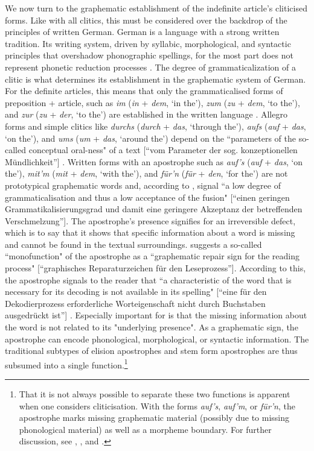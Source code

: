 We now turn to the graphematic establishment of the indefinite article's cliticised forms.
Like with all clitics, this must be considered over the backdrop of the principles of written German.
German is a language with a strong written tradition.
Its writing system, driven by syllabic, morphological, and syntactic principles that overshadow phonographic spellings, for the most part does not represent phonetic reduction processes \citep[309]{Eisenberg2013a}.
The degree of grammaticalization of a clitic is what determines its establishment in the graphematic system of German.
For the definite articles, this means that only the grammaticalised forms of preposition + article, such as \textit{im} (\textit{in} + \textit{dem}, `in the'), \textit{zum} (\textit{zu} + \textit{dem}, `to the'), and \textit{zur} (\textit{zu} + \textit{der}, `to the') are established in the written language \citep[304]{Nuebling1992}.
Allegro forms and simple clitics like \textit{durchs} (\textit{durch} + \textit{das}, `through the'), \textit{aufs} (\textit{auf} + \textit{das}, `on the'), and \textit{ums} (\textit{um} + \textit{das}, `around the') depend on the ``parameters of the so-called conceptual oral-ness" of a text [``vom Parameter der sog. konzeptionellen Mündlichkeit''] \citep[305]{Nuebling1992}.
Written forms with an apostrophe such as \textit{auf's} (\textit{auf} + \textit{das}, `on the'), \textit{mit'm} (\textit{mit} + \textit{dem}, `with the'), and \textit{für'n} (\textit{für} + \textit{den}, `for the') are not prototypical graphematic words \citep{Fuhrhop2008} and, according to \citet[308]{Nuebling1992}, signal ``a low degree of grammaticalisation and thus a low acceptance of the fusion" [``einen geringen Grammatikalisierungsgrad und damit eine geringere Akzeptanz der betreffenden Verschmelzung''].
The apostrophe's presence signifies for \citet{Bredel2008,Bredel2011} an irreversible defect, which is to say that it shows that specific information about a word is missing and cannot be found in the textual surroundings.
\citet[103]{Bredel2008} suggests a so-called ``monofunction" of the apostrophe as a ``graphematic repair sign for the reading process" [``graphisches Reparaturzeichen für den Leseprozess''].
According to this, the apostrophe signals to the reader that ``a characteristic of the word that is necessary for its decoding is not available in its spelling" [``eine für den Dekodierprozess erforderliche Worteigenschaft nicht durch Buchstaben ausgedrückt ist''] \citep[42]{Bredel2011}.
Especially important for \citet[43]{Bredel2008} is that the missing information about the word is not related to its "underlying presence".
As a graphematic sign, the apostrophe can encode phonological, morphological, or syntactic information.
The traditional subtypes of elision apostrophes and stem form apostrophes are thus subsumed into a single function.\footnote{
	That it is not always possible to separate these two functions is apparent when one considers cliticisation. With the forms \textit{auf's}, \textit{auf'm}, or \textit{für'n}, the apostrophe marks missing graphematic material (possibly due to missing phonological material) as well as a morpheme boundary. For further discussion, see \citet[307]{Nuebling1992}, \citet[41]{Bredel2011}, and \citet[104]{Bredel2008}.}

